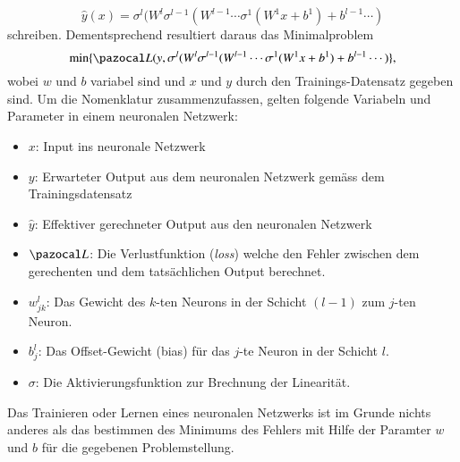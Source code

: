 \begin{equation}
\hat{y}(x) = \sigma^{l}(W^{l}\sigma^{l-1}(W^{l-1}\cdots \sigma^{1}(W^{1}x+b^{1}) + b^{l-1} \cdots )
\label{ableitung:eqn:full_net}
\end{equation}
schreiben. Dementsprechend resultiert daraus das Minimalproblem
\begin{equation}
	\min \{ \Lb(y, \sigma^{l}(W^{l}\sigma^{l-1}(W^{l-1}\cdots \sigma^{1}(W^{1}x+b^{1}) + b^{l-1} \cdots ) \} \text{,}
\end{equation}
wobei $w$ und $b$ variabel sind und $x$ und $y$ durch den Trainings-Datensatz gegeben sind.
Um die Nomenklatur zusammenzufassen, gelten folgende Variabeln und Parameter in einem neuronalen Netzwerk: 
\begin{itemize}
	\item{$x$: Input ins neuronale Netzwerk}
	\item{$y$: Erwarteter Output aus dem neuronalen Netzwerk gemäss dem Trainingsdatensatz}
	\item{$\hat{y}$: Effektiver gerechneter Output aus den neuronalen Netzwerk}
	\item{$\Lb$: Die Verlustfunktion (\textit{loss}) welche den Fehler zwischen dem gerechenten und dem tatsächlichen Output berechnet.}
	\item{$w_{jk}^{l}$: Das Gewicht des $k$-ten Neurons in der Schicht $(l-1)$ zum $j$-ten Neuron.}
	\item{$b_{j}^{l}$: Das Offset-Gewicht (bias) für das $j$-te Neuron in der Schicht $l$.}
	\item{$\sigma$: Die Aktivierungsfunktion zur Brechnung der Linearität.}
\end{itemize}
Das Trainieren oder Lernen eines neuronalen Netzwerks ist im Grunde nichts anderes als das bestimmen des Minimums des Fehlers mit Hilfe der Paramter $w$ und $b$ für die gegebenen Problemstellung. 